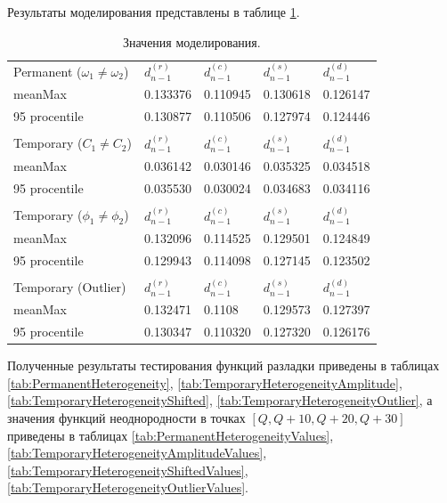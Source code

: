 \documentclass[specialist, substylefile = spbu.rtx,
			   subf, href, 12pt]{disser}
\begin{document}
Результаты моделирования представлены в таблице \ref{tab:ModellingResults}.
\begin{table}[!hhh]
	\center
	\caption{Значения моделирования.}
	\begin{tabular}{lllll}
		Permanent ($\omega_1 \neq \omega_2$) & $ d_{n-1}^{(r)} $ & $ d_{n-1}^{(c)} $ & $ d_{n-1}^{(s)} $ & $ d_{n-1}^{(d)} $ \\
		meanMax & 0.133376 & 0.110945 & 0.130618 & 0.126147 \\
		95 procentile & 0.130877 & 0.110506 & 0.127974 & 0.124446 \\
		&  &  &  &  \\
		Temporary ($C_1 \neq C_2$) & $ d_{n-1}^{(r)} $ & $ d_{n-1}^{(c)} $ & $ d_{n-1}^{(s)} $ & $ d_{n-1}^{(d)} $ \\
		meanMax & 0.036142 & 0.030146 & 0.035325 & 0.034518 \\
		95 procentile & 0.035530 & 0.030024 & 0.034683 & 0.034116 \\
		&  &  &  &  \\
		Temporary ($\phi_1 \neq \phi_2$) & $ d_{n-1}^{(r)} $ & $ d_{n-1}^{(c)} $ & $ d_{n-1}^{(s)} $ & $ d_{n-1}^{(d)} $ \\
		meanMax & 0.132096 & 0.114525 & 0.129501 & 0.124849 \\
		95 procentile & 0.129943 & 0.114098 & 0.127145 & 0.123502 \\
		&  &  &  &  \\
		Temporary (Outlier) & $ d_{n-1}^{(r)} $ & $ d_{n-1}^{(c)} $ & $ d_{n-1}^{(s)} $ & $ d_{n-1}^{(d)} $ \\
		meanMax & 0.132471 & 0.1108 & 0.129573 & 0.127397 \\
		95 procentile & 0.130347 & 0.110320 & 0.127320 & 0.126176
	\end{tabular}
	\label{tab:ModellingResults}
\end{table}


Полученные результаты тестирования функций разладки приведены в таблицах \ref{tab:PermanentHeterogeneity}, \ref{tab:TemporaryHeterogeneityAmplitude}, \ref{tab:TemporaryHeterogeneityShifted}, \ref{tab:TemporaryHeterogeneityOutlier}, а значения функций неоднородности в точках $[Q, Q+10, Q+20, Q+30] $ приведены в таблицах \ref{tab:PermanentHeterogeneityValues}, \ref{tab:TemporaryHeterogeneityAmplitudeValues}, \ref{tab:TemporaryHeterogeneityShiftedValues}, \ref{tab:TemporaryHeterogeneityOutlierValues}.
\end{document}
